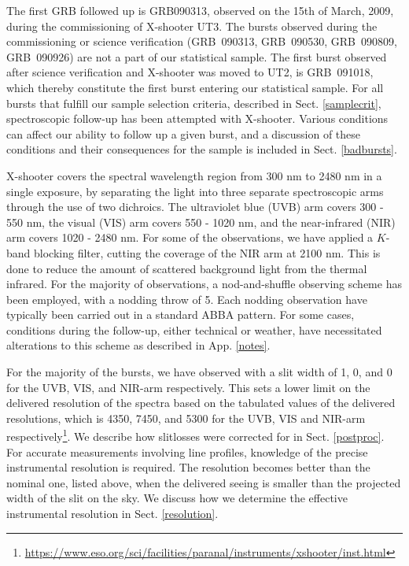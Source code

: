 \documentclass{aa}    %
\begin{document}
The first GRB followed up is GRB090313, observed on the 15th of March, 2009,
during the commissioning of X-shooter UT3. The bursts observed during the
commissioning or science verification (GRB~090313, GRB~090530, GRB~090809,
GRB~090926) are not a part of our statistical sample. The first burst observed
after science verification and X-shooter was moved to UT2, is GRB~091018, which
thereby constitute the first burst entering our statistical sample. For all
bursts that fulfill our sample selection criteria, described in Sect.
\ref{samplecrit}, spectroscopic follow-up has been attempted with X-shooter.
Various conditions can affect our ability to follow up a given burst, and a
discussion of these conditions and their consequences for the sample is
included in Sect. \ref{badbursts}.

X-shooter covers the spectral wavelength region from 300 nm to 2480 nm in a
single exposure, by separating the light into three separate spectroscopic arms
through the use of two dichroics. The ultraviolet blue (UVB) arm covers 300 -
550 nm, the visual (VIS) arm covers 550 - 1020 nm, and the near-infrared (NIR)
arm covers 1020 - 2480 nm. For some of the observations, we have applied a
$K$-band blocking filter, cutting the coverage of the NIR arm at 2100 nm. This
is done to reduce the amount of scattered background light from the thermal
infrared. For the majority of observations, a nod-and-shuffle observing scheme
has been employed, with a nodding throw of 5\arcsec. Each nodding observation
have typically been carried out in a standard ABBA pattern. For some cases,
conditions during the follow-up, either technical or weather, have necessitated
alterations to this scheme as described in App. \ref{notes}.

For the majority of the bursts, we have observed with a slit width of 1,
0, and 0 for the UVB, VIS, and NIR-arm respectively. This sets a
lower limit on the delivered resolution of the spectra based on the tabulated
values of the delivered resolutions, which is 4350, 7450, and 5300 for the UVB,
VIS and NIR-arm
respectively\footnote{\url{https://www.eso.org/sci/facilities/paranal/instruments/xshooter/inst.html}}. %
We describe how slitlosses were corrected for in Sect. \ref{postproc}. For
accurate measurements involving line profiles, knowledge of the precise
instrumental resolution is required. The resolution becomes better than the
nominal one, listed above, when the delivered seeing is smaller than the
projected width of the slit on the sky. We discuss how we determine the
effective instrumental resolution in Sect. \ref{resolution}.
\end{document}

